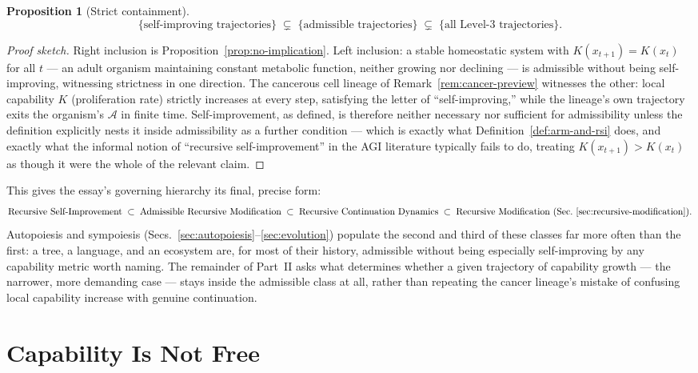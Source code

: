 \documentclass[11pt,a4paper]{article}
\theoremstyle{plain}
\newtheorem{proposition}[theorem]{Proposition}
\theoremstyle{definition}
\theoremstyle{remark}
\newcommand{\Adm}{\mathcal{A}}
\begin{document}
\begin{proposition}[Strict containment]
\label{prop:strict-containment}
\[
\{\text{self-improving trajectories}\} \;\subsetneq\; \{\text{admissible trajectories}\} \;\subsetneq\; \{\text{all Level-3 trajectories}\}.
\]
\end{proposition}

\begin{proof}[Proof sketch]
Right inclusion is Proposition~\ref{prop:no-implication}. Left inclusion: a stable homeostatic system with $K(x_{t+1})=K(x_t)$ for all $t$ — an adult organism maintaining constant metabolic function, neither growing nor declining — is admissible without being self-improving, witnessing strictness in one direction. The cancerous cell lineage of Remark~\ref{rem:cancer-preview} witnesses the other: local capability $K$ (proliferation rate) strictly increases at every step, satisfying the letter of ``self-improving,'' while the lineage's own trajectory exits the organism's $\Adm$ in finite time. Self-improvement, as defined, is therefore neither necessary nor sufficient for admissibility unless the definition explicitly nests it inside admissibility as a further condition — which is exactly what Definition~\ref{def:arm-and-rsi} does, and exactly what the informal notion of ``recursive self-improvement'' in the AGI literature typically fails to do, treating $K(x_{t+1})>K(x_t)$ as though it were the whole of the relevant claim.
\end{proof}

This gives the essay's governing hierarchy its final, precise form:
\[
\text{Recursive Self-Improvement} \;\subset\; \text{Admissible Recursive Modification} \;\subset\; \text{Recursive Continuation Dynamics} \;\subset\; \text{Recursive Modification (Sec.~\ref{sec:recursive-modification})}.
\]
Autopoiesis and sympoiesis (Secs.~\ref{sec:autopoiesis}--\ref{sec:evolution}) populate the second and third of these classes far more often than the first: a tree, a language, and an ecosystem are, for most of their history, admissible without being especially self-improving by any capability metric worth naming. The remainder of Part~II asks what determines whether a given trajectory of capability growth — the narrower, more demanding case — stays inside the admissible class at all, rather than repeating the cancer lineage's mistake of confusing local capability increase with genuine continuation.

\section{Capability Is Not Free}
\label{sec:complexity-repair}
\end{document}
